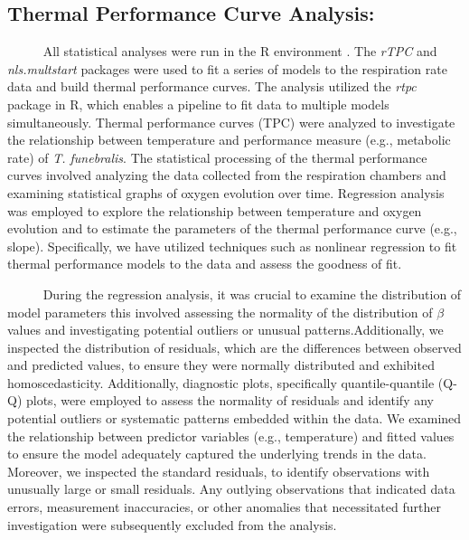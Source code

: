 \documentclass[
  12pt,
]{article}
\begin{document}
\newpage

\subsection*{Thermal Performance Curve Analysis:}

~~~~~ All statistical analyses were run in the R environment
\citep{R_core_team_2021}. The \textit{rTPC} \citep{padfield2021rtpc} and
\textit{nls.multstart} packages were used to fit a series of models to
the respiration rate data and build thermal performance curves. The
analysis utilized the \textit{rtpc} package in R, which enables a
pipeline to fit data to multiple models simultaneously. Thermal
performance curves (TPC) were analyzed to investigate the relationship
between temperature and performance measure (e.g., metabolic rate) of
\textit{T. funebralis}. The statistical processing of the thermal
performance curves involved analyzing the data collected from the
respiration chambers and examining statistical graphs of oxygen
evolution over time. Regression analysis was employed to explore the
relationship between temperature and oxygen evolution and to estimate
the parameters of the thermal performance curve (e.g., slope).
Specifically, we have utilized techniques such as nonlinear regression
to fit thermal performance models to the data and assess the goodness of
fit.

~~~~~ During the regression analysis, it was crucial to examine the
distribution of model parameters this involved assessing the normality
of the distribution of \(\beta\) values and investigating potential
outliers or unusual patterns.Additionally, we inspected the distribution
of residuals, which are the differences between observed and predicted
values, to ensure they were normally distributed and exhibited
homoscedasticity. Additionally, diagnostic plots, specifically
quantile-quantile (Q-Q) plots, were employed to assess the normality of
residuals and identify any potential outliers or systematic patterns
embedded within the data. We examined the relationship between predictor
variables (e.g., temperature) and fitted values to ensure the model
adequately captured the underlying trends in the data. Moreover, we
inspected the standard residuals, to identify observations with
unusually large or small residuals. Any outlying observations that
indicated data errors, measurement inaccuracies, or other anomalies that
necessitated further investigation were subsequently excluded from the
analysis.

\newpage
\end{document}
